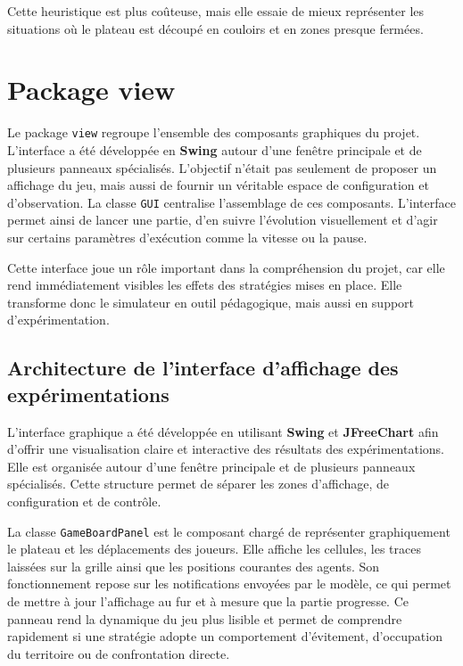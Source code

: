 \documentclass[11pt,a4paper]{article}
\begin{document}
Cette heuristique est plus coûteuse, mais elle essaie de mieux représenter les situations où le plateau est découpé en couloirs et en zones presque fermées.


\section{Package view}

Le package \texttt{view} regroupe l’ensemble des composants graphiques du projet. L’interface a été développée en \textbf{Swing} autour d’une fenêtre principale et de plusieurs panneaux spécialisés. L’objectif n’était pas seulement de proposer un affichage du jeu, mais aussi de fournir un véritable espace de configuration et d’observation. La classe \texttt{GUI} centralise l’assemblage de ces composants. L’interface permet ainsi de lancer une partie, d’en suivre l’évolution visuellement et d’agir sur certains paramètres d’exécution comme la vitesse ou la pause.

Cette interface joue un rôle important dans la compréhension du projet, car elle rend immédiatement visibles les effets des stratégies mises en place. Elle transforme donc le simulateur en outil pédagogique, mais aussi en support d’expérimentation.

\subsection{Architecture de l'interface d'affichage des expérimentations}

L’interface graphique a été développée en utilisant \textbf{Swing} et \textbf{JFreeChart} afin d’offrir une visualisation claire et interactive des résultats des expérimentations. Elle est organisée autour d’une fenêtre principale et de plusieurs panneaux spécialisés. Cette structure permet de séparer les zones d’affichage, de configuration et de contrôle.

La classe \texttt{GameBoardPanel} est le composant chargé de représenter graphiquement le plateau et les déplacements des joueurs. Elle affiche les cellules, les traces laissées sur la grille ainsi que les positions courantes des agents. Son fonctionnement repose sur les notifications envoyées par le modèle, ce qui permet de mettre à jour l’affichage au fur et à mesure que la partie progresse. Ce panneau rend la dynamique du jeu plus lisible et permet de comprendre rapidement si une stratégie adopte un comportement d’évitement, d’occupation du territoire ou de confrontation directe.
\end{document}
